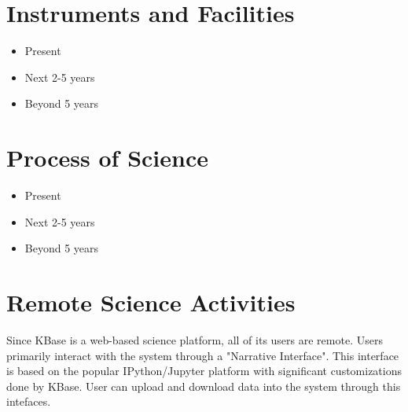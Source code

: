 \documentclass[10pt,a4paper]{report}
\begin{document}
\section{Instruments and Facilities}
\begin{itemize}
\item Present
\item Next 2-5 years
\item Beyond 5 years
\end{itemize}

\section{Process of Science}
\begin{itemize}
\item Present
\item Next 2-5 years
\item Beyond 5 years
\end{itemize}

\section{Remote Science Activities}

Since KBase is a web-based science platform, all of its users are remote.  Users primarily interact with the system through a "Narrative Interface".  This interface is based on the popular IPython/Jupyter platform with significant customizations done by KBase.  User can upload and download data into the system through this intefaces.
\end{document}
